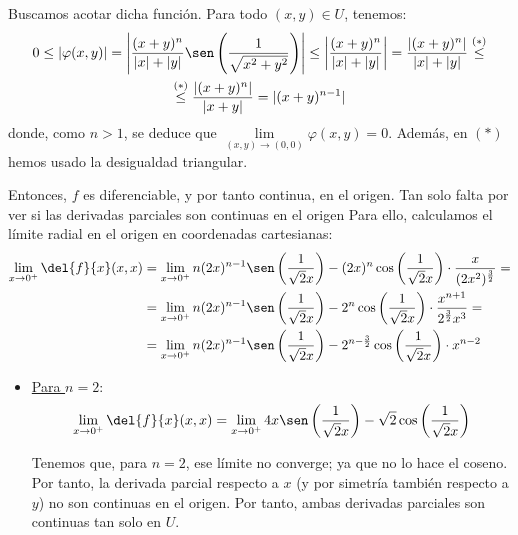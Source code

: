 \begin{ejercicio}
\begin{itemize}
        Buscamos acotar dicha función. Para todo $(x,y)\in U$, tenemos:
        \begin{multline*}
            0\leq |\varphi(x,y)| = \left|\frac{(x+y)^n}{|x|+|y|} \sen\left(\frac{1}{\sqrt{x^2+y^2}}\right)\right|\leq \left|\frac{(x+y)^n}{|x|+|y|}\right|
            = \frac{\left|(x+y)^n\right|}{|x|+|y|}
            \stackrel{(\ast)}{\leq}\\\stackrel{(\ast)}{\leq}
            \frac{\left|(x+y)^n\right|}{|x+y|} = |(x+y)^{n-1}|
        \end{multline*}
        donde, como $n>1$, se deduce que $\lim\limits_{(x,y)\to (0,0)} \varphi(x,y) = 0$. Además, en $(\ast)$ hemos usado la desigualdad triangular.
        
        Entonces, $f$ es diferenciable, y por tanto continua, en el origen. Tan solo falta por ver si las derivadas parciales son continuas en el origen 
        Para ello, calculamos el límite radial en el origen en coordenadas cartesianas:
        \begin{equation*}
            \begin{split}
                \lim_{x\to 0^+}\del{f}{x}(x,x)
                &= \lim_{x\to 0^+}  n(2x)^{n-1}\sen\left(\dfrac{1}{\sqrt{2}x}\right) -(2x)^n \cos\left(\dfrac{1}{\sqrt{2}x}\right)\cdot \frac{x}{(2x^2)^{\frac{3}{2}}} =\\
                &= \lim_{x\to 0^+}  n(2x)^{n-1}\sen\left(\dfrac{1}{\sqrt{2}x}\right) -2^n \cos\left(\dfrac{1}{\sqrt{2}x}\right)\cdot \frac{x^{n+1}}{2^{\frac{3}{2}}x^3}
                =\\
                &= \lim_{x\to 0^+}  n(2x)^{n-1}\sen\left(\dfrac{1}{\sqrt{2}x}\right) -2^{n-\frac{3}{2}} \cos\left(\dfrac{1}{\sqrt{2}x}\right)\cdot x^{n-2}
            \end{split}
        \end{equation*}

        \begin{itemize}
            \item \ul{Para $n=2$}:
            \begin{equation*}
                \begin{split}
                    \lim_{x\to 0^+}\del{f}{x}(x,x)= \lim_{x\to 0^+}  4x\sen\left(\dfrac{1}{\sqrt{2}x}\right) -\sqrt{2} \cos\left(\dfrac{1}{\sqrt{2}x}\right)
                \end{split}
            \end{equation*}

            Tenemos que, para $n=2$, ese límite no converge; ya que no lo hace el coseno. Por tanto, la derivada parcial respecto a $x$ (y por simetría también respecto a $y$) no son continuas en el origen. Por tanto, ambas derivadas parciales son continuas tan solo en $U$.


\end{itemize}
\end{itemize}
\end{ejercicio}
